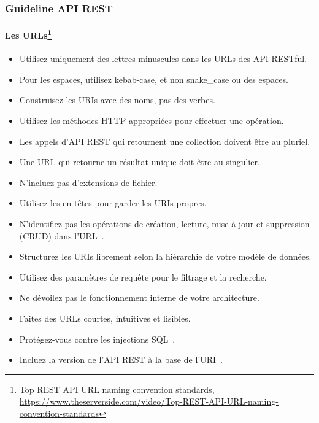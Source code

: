 \documentclass{beamer}
\begin{document}
    \begin{frame}
        \transdissolve
        \frametitle{Guideline API REST}
        \framesubtitle{Les URLs\footnote{Top REST API URL naming convention standards, \url{https://www.theserverside.com/video/Top-REST-API-URL-naming-convention-standards}}}
        \begin{tiny}
            \begin{itemize}
                \item Utilisez uniquement des lettres minuscules dans les URLs des API RESTful.
                \item Pour les espaces, utilisez kebab-case, et non snake\_case ou des espaces.
                \item Construisez les URIs avec des noms, pas des verbes.
                \item Utilisez les méthodes HTTP appropriées pour effectuer une opération.
                \item Les appels d'API REST qui retournent une collection doivent être au pluriel.
                \item Une URL qui retourne un résultat unique doit être au singulier.
                \item N'incluez pas d'extensions de fichier.
                \item Utilisez les en-têtes pour garder les URIs propres.
                \item N'identifiez pas les opérations de création, lecture, mise à jour et suppression (CRUD) dans l'URL~.
                \item Structurez les URIs librement selon la hiérarchie de votre modèle de données.
                \item Utilisez des paramètres de requête pour le filtrage et la recherche.
                \item Ne dévoilez pas le fonctionnement interne de votre architecture.
                \item Faites des URLs courtes, intuitives et lisibles.
                \item Protégez-vous contre les injections SQL~.
                \item Incluez la version de l'API REST à la base de l'URI~.
            \end{itemize}
        \end{tiny}
    \end{frame}
\end{document}
